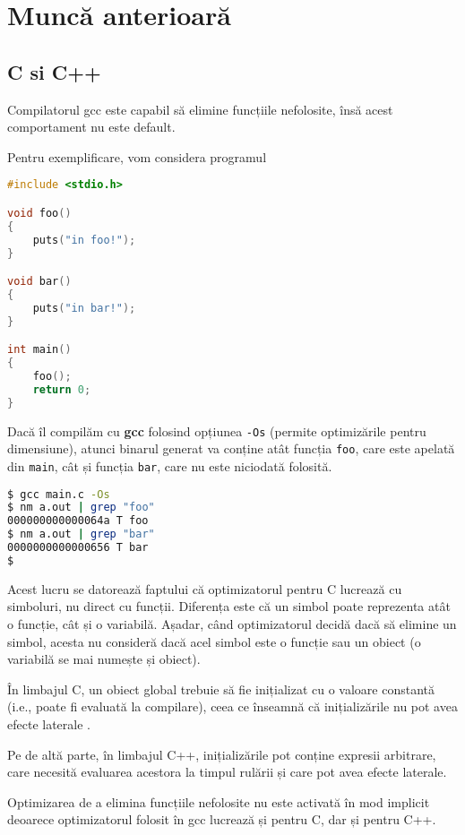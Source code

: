 \section{Muncă anterioară}

\subsection{C si C++}

Compilatorul gcc este capabil să elimine funcțiile nefolosite,
însă acest comportament nu este default.

Pentru exemplificare, vom considera programul
\begin{lstlisting}[language=C, title=main.c,
label=c:program]
#include <stdio.h>

void foo()
{
    puts("in foo!");
}

void bar()
{
    puts("in bar!");
}

int main()
{
    foo();
    return 0;
}
\end{lstlisting}

Dacă îl compilăm cu \textbf{gcc} folosind opțiunea \texttt{-Os}
(permite optimizările pentru dimensiune), atunci binarul generat
va conține atât funcția \texttt{foo}, care este apelată din
\texttt{main}, cât și funcția \texttt{bar}, care nu este
niciodată folosită.

\begin{lstlisting}[language=Bash]
$ gcc main.c -Os
$ nm a.out | grep "foo"
000000000000064a T foo
$ nm a.out | grep "bar"
0000000000000656 T bar
$
\end{lstlisting}

Acest lucru se datorează faptului că optimizatorul pentru C
lucrează cu simboluri, nu direct cu funcții.  Diferența este că
un simbol poate reprezenta atât o funcție, cât și o variabilă.
Așadar, când optimizatorul decidă dacă să elimine un simbol,
acesta nu consideră dacă acel simbol este o funcție sau un obiect
(o variabilă se mai numește și obiect).

În limbajul C, un obiect global trebuie să fie inițializat cu o
valoare constantă (i.e., poate fi evaluată la compilare), ceea ce
înseamnă că inițializările nu pot avea efecte laterale
\cite{c_static_init}.

Pe de altă parte, în limbajul C++, inițializările pot conține
expresii arbitrare, care necesită evaluarea acestora la timpul
rulării \cite{cpp_static_init} și care pot avea efecte laterale.

Optimizarea de a elimina funcțiile nefolosite nu este activată în
mod implicit deoarece optimizatorul folosit în gcc lucrează și
pentru C, dar și pentru C++.

